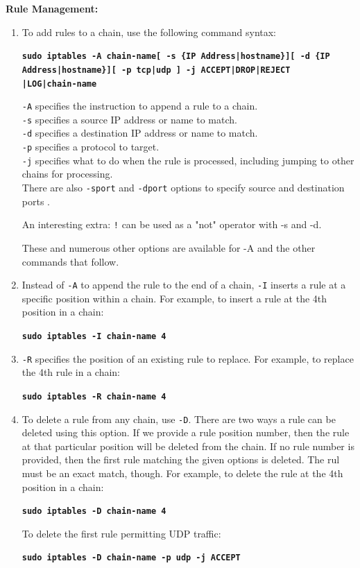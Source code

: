 \documentclass[12pt]{extarticle}
\begin{document}
\item \textbf{Rule Management:}
\begin{enumerate}

\item To add rules to a chain, use the following command syntax:

\texttt{\textbf{sudo iptables -A chain-name[ -s \{IP Address|hostname\}][ -d \{IP Address|hostname\}][ -p tcp|udp ] -j ACCEPT|DROP|REJECT\\|LOG|chain-name}}

\texttt{-A} specifies the instruction to append a rule to a chain.\\
\texttt{-s} specifies a source IP address or name to match.\\
\texttt{-d} specifies a destination IP address or name to match.\\ \texttt{-p} specifies a protocol to target.\\
\texttt{-j} specifies what to do when the rule is processed, including jumping to other chains for processing.\\
There are also \texttt{-sport} and \texttt{-dport} options to specify source and destination ports \cite{IPTablesSPortDPort}.

An interesting extra: \texttt{!} can be used as a "not" operator with -s and -d.

These and numerous other options are available for -A and the other commands that follow.

\item Instead of \texttt{-A} to append the rule to the end of a chain, \texttt{-I} inserts a rule at a specific position within a chain. For example, to insert a rule at the 4th position in a chain:

\texttt{\textbf{sudo iptables -I chain-name 4}}

\item \texttt{-R} specifies the position of an existing rule to replace. For example, to replace the 4th rule in a chain:

\texttt{\textbf{sudo iptables -R chain-name 4}}

\item To delete a rule from any chain, use \texttt{-D}. There are two ways a rule can be deleted using this option. If we provide a rule position number, then the rule at that particular position will be deleted from the chain. If no rule number is provided, then the first rule matching the given options is deleted. The rul must be an exact match, though. For example, to delete the rule at the 4th position in a chain:

\texttt{\textbf{sudo iptables -D chain-name 4}}

To delete the first rule permitting UDP traffic:

\texttt{\textbf{sudo iptables -D chain-name -p udp -j ACCEPT}} 

\end{enumerate}
\end{document}
